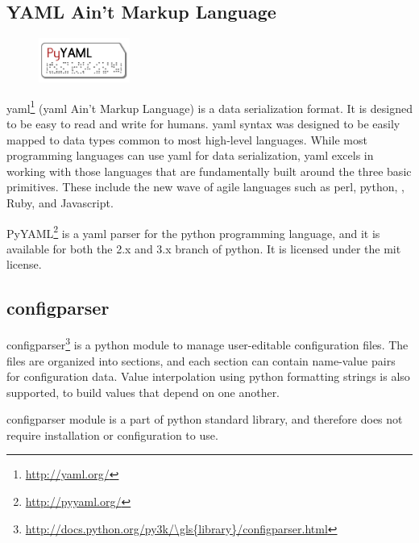\subsection{YAML Ain't Markup Language}
\label{sec:pre:yaml}
\begin{figure}
	\vspace{-30pt}
	\includegraphics[width=3cm]{./planning/img/pyyaml_logo}
	\vspace{-30pt}
\end{figure}
\Gls{yaml}\footnote{\url{http://yaml.org/}} (\Gls{yaml} Ain't Markup Language) is a \gls{data serialization} format.
It is designed to be easy to read and write for humans.
\Gls{yaml} syntax was designed to be easily mapped to data types common to most
high-level languages. While most programming languages can use \Gls{yaml} for data
serialization, \Gls{yaml} excels in working with those languages that are
fundamentally built around the three basic primitives. These include the new
wave of agile languages such as \Gls{perl}, \Gls{python}, , \Gls{Ruby}, and \Gls{Javascript}.

PyYAML\footnote{\url{http://pyyaml.org/}} is a \Gls{yaml} \gls{parser} for the \Gls{python}
programming language, and it is available for both the 2.x and 3.x \gls{branch} of
\Gls{python}. It is licensed under the \Gls{mit} license.

\subsection{configparser}
configparser\footnote{\url{http://docs.python.org/py3k/\gls{library}/configparser.html}}
is a \Gls{python} module to manage user-editable configuration files. The
files are organized into sections, and each section can contain name-value
pairs for configuration data. Value interpolation using \Gls{python} formatting
strings is also supported, to build values that depend on one another.

configparser module is a part of \Gls{python} standard \gls{library}, and therefore does
not require installation or configuration to use.

